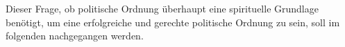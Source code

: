 Dieser Frage, ob politische Ordnung überhaupt eine spirituelle Grundlage
benötigt, um eine erfolgreiche und gerechte politische Ordnung zu sein, soll
im folgenden nachgegangen werden.




